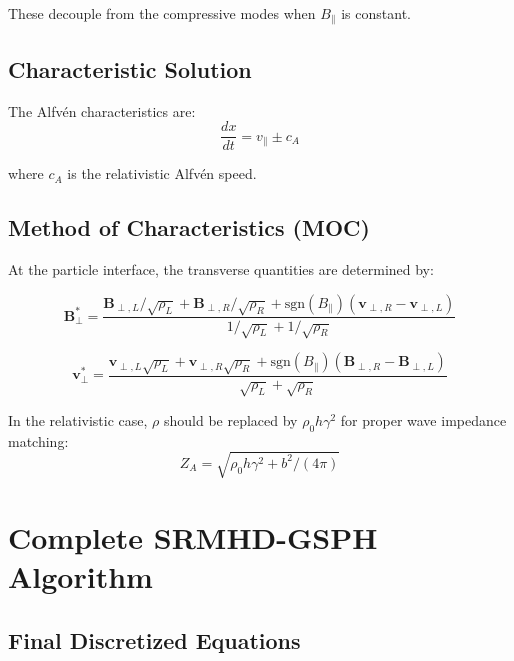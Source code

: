 \documentclass[12pt,a4paper]{article}
\begin{document}
These decouple from the compressive modes when $B_\parallel$ is constant.

\subsection{Characteristic Solution}

The Alfv\'en characteristics are:
\begin{equation}
\frac{dx}{dt} = v_\parallel \pm c_A
\label{eq:alfven_characteristic}
\end{equation}

where $c_A$ is the relativistic Alfv\'en speed.

\subsection{Method of Characteristics (MOC)}

At the particle interface, the transverse quantities are determined by:

\begin{equation}
\bm{B}_\perp^* = \frac{\bm{B}_{\perp,L}/\sqrt{\rho_L} + \bm{B}_{\perp,R}/\sqrt{\rho_R}
+ \text{sgn}(B_\parallel)(\bm{v}_{\perp,R} - \bm{v}_{\perp,L})}
{1/\sqrt{\rho_L} + 1/\sqrt{\rho_R}}
\label{eq:moc_B}
\end{equation}

\begin{equation}
\bm{v}_\perp^* = \frac{\bm{v}_{\perp,L}\sqrt{\rho_L} + \bm{v}_{\perp,R}\sqrt{\rho_R}
+ \text{sgn}(B_\parallel)(\bm{B}_{\perp,R} - \bm{B}_{\perp,L})}
{\sqrt{\rho_L} + \sqrt{\rho_R}}
\label{eq:moc_v}
\end{equation}

In the relativistic case, $\rho$ should be replaced by $\rho_0 h \gamma^2$ for proper wave impedance matching:
\begin{equation}
Z_A = \sqrt{\rho_0 h \gamma^2 + b^2/(4\pi)}
\label{eq:alfven_impedance}
\end{equation}

\section{Complete SRMHD-GSPH Algorithm}

\subsection{Final Discretized Equations}
\end{document}
